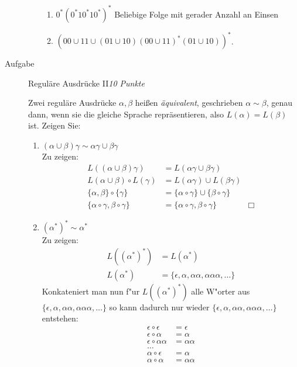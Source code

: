 \documentclass[a4paper,twoside,12pt,fleqn]{article}
\newcounter{AUFGNR}
\newcommand{\AUFGABE}[2]{\vspace{0.3cm}\item[Aufgabe~\arabic{AUFGNR}]\stepcounter{AUFGNR} #1\hfill\emph{#2}}
\begin{document}
\begin{description}
\begin{enumerate}
		      \begin{enumerate}
            \item $0^*(0^* 1 0^* 1 0^*)^*$
            Beliebige Folge mit gerader Anzahl an Einsen
			      \item $(00 \cup 11 \cup (01 \cup 10) (00 \cup 11)^* (01 \cup 10))^*$.
		      \end{enumerate}
	\end{enumerate}

	\AUFGABE{Regul\"are Ausdr\"ucke II}{10 Punkte}

	Zwei regul\"are Ausdr\"ucke $\alpha, \beta$ hei\ss{}en \emph{\"aquivalent},
	geschrieben $\alpha \sim \beta$, genau dann, wenn sie die gleiche
	Sprache repr\"asentieren, also $L(\alpha)=L(\beta)$ ist.
	\renewcommand{\a}{\alpha}
	\renewcommand{\b}{\beta}
	\newcommand{\e}{\epsilon}
	Zeigen Sie:
	\begin{enumerate}
		\item $(\alpha \cup \beta)\gamma \sim \alpha\gamma \cup \beta\gamma$\\
		Zu zeigen:
		\begin{align*}
			L((\alpha\cup\beta)\gamma) &= L(\alpha\gamma\cup\beta\gamma)\\
			L(\alpha\cup\beta)\circ L(\gamma) &= L(\alpha\gamma)\cup L(\beta\gamma)\\
			\{\alpha, \beta\}\circ\{\gamma\} &= \{\alpha\circ\gamma\}\cup\{\beta\circ\gamma\}\\
			\{\alpha\circ\gamma, \beta\circ\gamma\} &= \{\alpha\circ\gamma, \beta\circ\gamma\} &\Box
		\end{align*}
		\item $(\alpha^*)^* \sim \alpha^*$\\
		Zu zeigen:
		\begin{align*}
			L((\alpha^*)^*) &= L(\alpha^*)\\
			L(\a^*) &= \{\epsilon,\a,\a\a,\a\a\a,\dots\}
		\end{align*}
		Konkateniert man nun f"ur $L((\a^*)^*)$ alle W"orter aus
		$\{\epsilon,\a,\a\a,\a\a\a,\dots\}$ so kann dadurch nur wieder
		$\{\epsilon,\a,\a\a,\a\a\a,\dots\}$ entstehen:
		\begin{align*}
			\e\circ\e &= \e\\
			\e\circ\a &= \a\\
			\e\circ\a\a &= \a\a\\
			\dots\\
			\a\circ\e &= \a\\
			\a\circ\a &= \a\a\\

\end{align*}
\end{enumerate}
\end{description}
\end{document}
